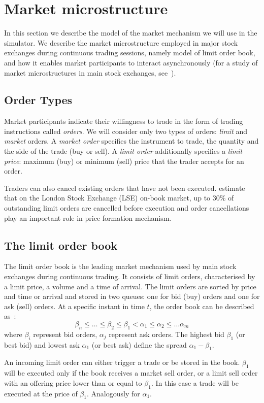 \section{Market microstructure}
\label{Chapters/Background/Market-Microstructure}

In this section we describe the model of the market mechanism we will use in the simulator. We describe the market microstructure employed in major stock exchanges during continuous trading sessions, namely model of limit order book, and how it enables market participants to interact asynchronously (for a study of market microstructures in main stock exchanges, see~\cite{Comerton2004}). 

\subsection{Order Types}
Market participants indicate their willingness to trade in the form of trading instructions called \textit{orders}. We will consider only two types of orders: \textit{limit} and \textit{market} orders. A \textit{market order} specifies the instrument to trade, the quantity and the side of the trade (buy or sell). A \textit{limit order} additionally specifies a \textit{limit price}: maximum (buy) or minimum (sell) price that the trader accepts for an order. 

Traders can also cancel existing orders that have not been executed. \citet{Lilo2004} estimate that on the London Stock Exchange (LSE) on-book market, up to 30\% of outstanding limit orders are cancelled before execution and order cancellations play an important role in price formation mechanism. 

\subsection{The limit order book}
The limit order book is the leading market mechanism used by main stock exchanges during continuous trading. It consists of limit orders, characterised by a limit price, a volume and a time of arrival. The limit orders are sorted by price and time or arrival and stored in two queues: one for bid (buy) orders and one for ask (sell) orders. At a specific instant in time $t$, the order book can be described as~\cite{Gilles2006}: 
\begin{equation*}
\beta_n \leq \ldots \leq \beta_2 \leq \beta_1 < \alpha_1 \leq \alpha_2 \leq \ldots \alpha_m
\end{equation*}
where $\beta_i$ represent bid orders, $\alpha_j$ represent ask orders. The highest bid $\beta_1$ (or best bid) and lowest ask $\alpha_1$ (or best ask) define the spread $\alpha_1 - \beta_1$.

An incoming limit order can either trigger a trade or be stored in the book.    $\beta_1$ will be executed only if the book receives a market sell order, or a limit sell order with an offering price lower than or equal to $\beta_1$. In this case a trade will be executed at the price of $\beta_1$. Analogously for $\alpha_1$.






